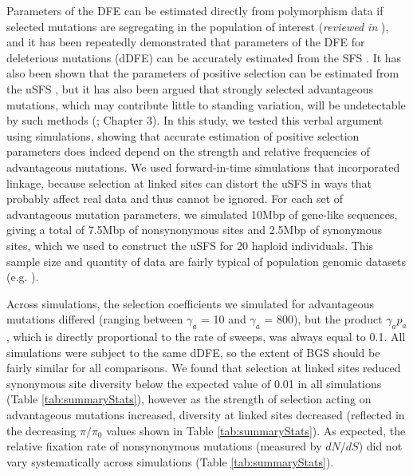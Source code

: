 {	Parameters of the DFE can be estimated directly from polymorphism data if selected mutations are segregating in the population of interest (\textit{reviewed in} \citealt{RN109}), and it has been repeatedly demonstrated that parameters of the DFE for deleterious mutations (dDFE) can be accurately estimated from the SFS \citep{RN201, RN164, RN178, RN354}. It has also been shown that the parameters of positive selection can be estimated from the uSFS \citep{RN210, RN354}, but it has also been argued that strongly selected advantageous mutations, which may contribute little to standing variation, will be undetectable by such methods (\citealt{RN290}; Chapter 3). In this study, we tested this verbal argument using simulations, showing that accurate estimation of positive selection parameters does indeed depend on the strength and relative frequencies of advantageous mutations. We used forward-in-time simulations that incorporated linkage, because selection at linked sites can distort the uSFS in ways that probably affect real data and thus cannot be ignored. For each set of advantageous mutation parameters, we simulated 10Mbp of gene-like sequences, giving a total of 7.5Mbp of nonsynonymous sites and 2.5Mbp of synonymous sites, which we used to construct the uSFS for 20 haploid individuals. This sample size and quantity of data are fairly typical of population genomic datasets (e.g. \citealt{RN236, RN238, RN368}). 

	Across simulations, the selection coefficients we simulated for advantageous mutations differed (ranging between $\gamma_a$ = 10 and $\gamma_a$ = 800), but the product $\gamma_a p_a$, which is directly proportional to the rate of sweeps, was always equal to 0.1. All simulations were subject to the same dDFE, so the extent of BGS should be fairly similar for all comparisons. We found that selection at linked sites reduced synonymous site diversity below the expected value of 0.01 in all simulations (Table \ref{tab:summaryStats}),  however as the strength of selection acting on advantageous mutations increased, diversity at linked sites decreased (reflected in the decreasing $\pi/\pi_0$ values shown in Table \ref{tab:summaryStats}). As expected, the relative fixation rate of nonsynonymous mutations (measured by $dN/dS$) did not vary systematically across simulations (Table \ref{tab:summaryStats}).

\linespread{1}
	
\linespread{2}

\linespread{1}

\linespread{2}


}
